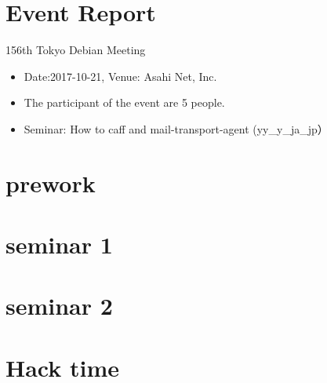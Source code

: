 \section{Event Report}

\begin{frame}{156th Tokyo Debian Meeting}
\begin{itemize}
\item Date:2017-10-21, Venue: Asahi Net, Inc.
\item The participant of the event are 5 people.
\item Seminar: How to caff and mail-transport-agent (yy\_y\_ja\_jp）
\end{itemize}
\end{frame}


\section{prework}
{\footnotesize
 
}

%

\section{seminar 1}

\section{seminar 2}

\section{Hack time}

